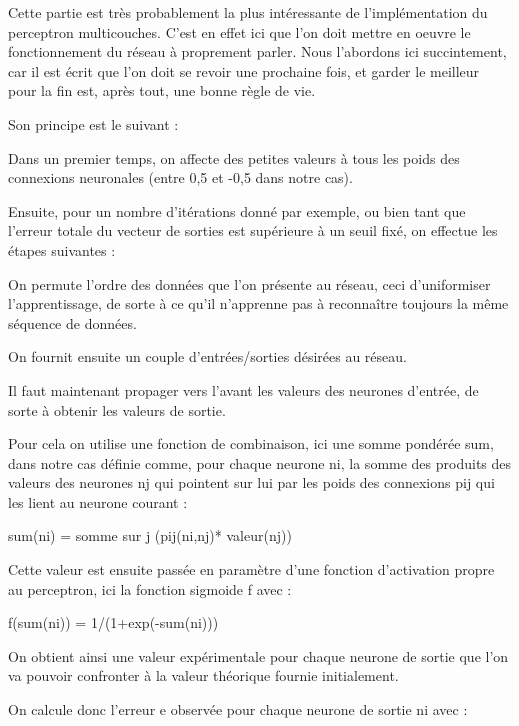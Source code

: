 \documentclass[a4paper,10pt]{report}
\begin{document}
Cette partie est tr\`es probablement la plus int\'eressante de
l'impl\'ementation du perceptron multicouches. C'est en effet ici que
l'on doit mettre en oeuvre le fonctionnement du r\'eseau \`a proprement
parler. Nous l'abordons ici succintement, car il est écrit que l'on doit
se revoir une prochaine fois, et garder le meilleur pour la fin est,
après tout, une bonne règle de vie. 

Son principe est le suivant :

Dans un premier temps, on affecte des petites valeurs \`a tous les poids
des connexions neuronales (entre 0,5 et -0,5 dans notre cas).

Ensuite, pour un nombre d'it\'erations donn\'e par exemple, ou bien tant
que l'erreur totale du vecteur de sorties est supérieure à un seuil fixé, on effectue
les \'etapes suivantes :

On permute l'ordre des donn\'ees que l'on pr\'esente au r\'eseau, ceci
d'uniformiser l'apprentissage, de sorte \`a ce qu'il n'apprenne pas \`a reconna\^itre toujours la m\^eme
s\'equence de donn\'ees.

On fournit ensuite un couple d'entr\'ees/sorties d\'esir\'ees au
r\'eseau.

Il faut maintenant propager vers l'avant les valeurs des neurones
d'entr\'ee, de sorte \`a obtenir les valeurs de sortie.

Pour cela on utilise une fonction de combinaison, ici une somme
pond\'er\'ee sum, dans notre cas
d\'efinie comme, pour chaque neurone ni, la somme des produits des valeurs
des neurones nj qui pointent sur lui par les poids des connexions pij qui les
lient au neurone courant :

sum(ni) = somme sur j (pij(ni,nj)* valeur(nj))


Cette valeur est ensuite pass\'ee en param\`etre d'une fonction
d'activation propre au perceptron, ici la fonction sigmo\¨ide f avec :  

f(sum(ni)) = 1/(1+exp(-sum(ni))) 

On obtient ainsi une valeur exp\'erimentale pour chaque neurone de
sortie que l'on va pouvoir confronter \`a la valeur th\'eorique fournie
initialement.

On calcule donc l'erreur e observ\'ee pour chaque neurone de sortie ni avec :
\end{document}
